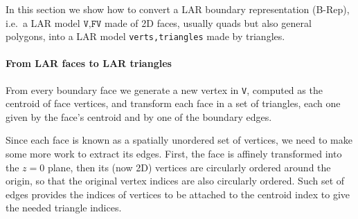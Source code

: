 \documentclass[11pt,oneside]{article}	%
\begin{document}
In this section we show how to convert a LAR boundary representation (B-Rep), i.e.~a LAR model $\texttt{V,FV}$ made of 2D faces, usually quads but also general polygons, into a LAR model \texttt{verts,triangles} made by triangles.

\paragraph{From LAR faces to LAR triangles}
From every boundary face we generate a new vertex in \texttt{V}, computed as the centroid of face vertices, and transform each face in a set of triangles, each one given by the face's centroid and by one of the boundary edges. 

Since each face is known as a spatially unordered set of vertices, we need to make some more work to extract its edges. First, the face is affinely transformed into the $z=0$ plane, then its (now 2D) vertices are circularly ordered around the origin, so that the original vertex indices are also circularly ordered. Such set of edges provides the indices of vertices to be attached to the centroid index to give the needed triangle indices.
\end{document}
